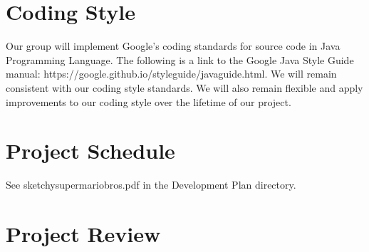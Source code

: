 \documentclass{article}
\begin{document}
\section{Coding Style}

Our group will implement Google’s coding standards for source code in Java Programming Language. The following is a link to the Google Java Style Guide manual:  https://google.github.io/styleguide/javaguide.html. We will remain consistent with our coding style standards. We will also remain flexible and apply improvements to our coding style over  the lifetime of our project.

\section{Project Schedule}

See sketchysupermariobros.pdf in the Development Plan directory.

\section{Project Review}
\end{document}

